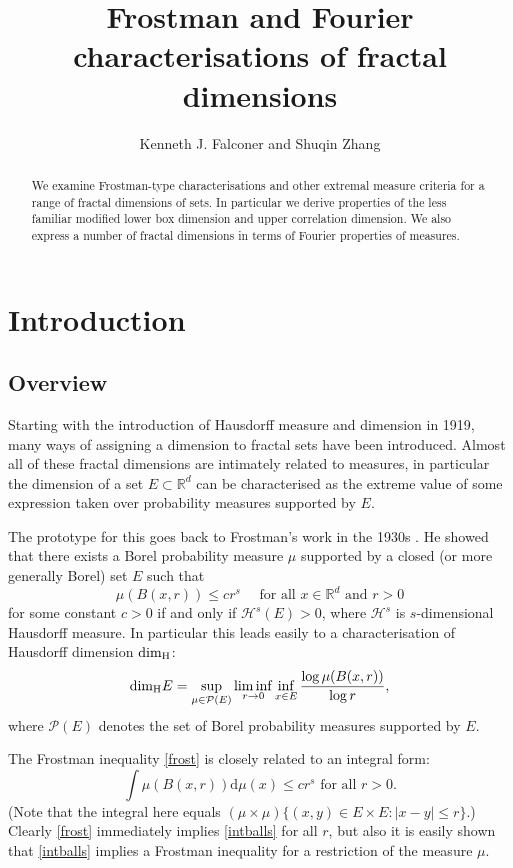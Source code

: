 \documentclass[12pt]{article}
\title{Frostman and Fourier characterisations of fractal dimensions}
\author{Kenneth J. Falconer and Shuqin Zhang}
\date{}
\newcommand{\1}{{\bf 1}}
\newcommand\hdd{\mbox{\rm dim}_{\rm H}} %
\newcommand{\R}{\mathbb{R}}
\begin{document}
\maketitle


\begin{abstract}
We examine Frostman-type characterisations and other extremal measure criteria for a range of fractal dimensions of sets. In particular we derive properties of the less familiar modified lower box dimension and upper correlation dimension. We also express a number of fractal dimensions in terms of Fourier properties of measures.
\end{abstract}

\section{Introduction}
\setcounter{equation}{0}
\setcounter{theo}{0}

\subsection{Overview}
Starting with the introduction of Hausdorff measure and dimension in 1919, many ways of assigning a dimension to fractal sets have been introduced. Almost all of these fractal dimensions are intimately related to measures, in particular the dimension of a set $E \subset \mathbb{R}^d$  can be characterised as the extreme value of some expression  taken over probability measures supported by $E$.

The prototype for this goes back to Frostman's work in the 1930s \cite{Fro}. He showed that there exists a Borel probability measure $\mu$ supported by a closed (or more generally Borel) set $E$ such that 
\begin{equation}\label{frost}
\mu(B(x,r))\leq cr^s \quad \text{ for all } x \in \R^d \text{ and } r>0
\end{equation}
for some constant $c>0$ if and only if 
$\mathcal{H}^s(E)>0$, where $\mathcal{H}^s$  is $s$-dimensional Hausdorff measure.
In particular this leads easily to a characterisation of Hausdorff dimension $\hdd$:
\begin{equation}\label{frostdim}
\hdd E 
	=  \sup_{\mu\in {\mathcal P}(E)} \liminf_{r\to 0} \inf_{x\in E} \frac{\log  \mu(B(x,r))}{ \log r},\end{equation}
	where  ${\mathcal P}(E) $ denotes the set of Borel probability measures supported by $E$. 

The Frostman inequality \eqref{frost} is closely related to an integral form:
\begin{equation}\label{intballs}
 \int \mu(B(x,r))\mathrm{d}\mu(x) \leq cr^s  \text{ for all }  r>0.
\end{equation}
(Note that the integral here equals $(\mu\times\mu)\{(x,y) \in E \times E :|x-y|\leq r\}$.)
Clearly \eqref{frost} immediately implies \eqref{intballs} for all $r$, but also it is easily shown that \eqref{intballs} implies a Frostman inequality for a restriction of the measure $\mu$. 
\end{document}
